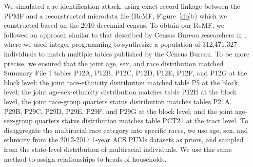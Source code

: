 \documentclass{article}
\begin{document}
We simulated a re-identification attack, using exact record linkage between the PPMF and a reconstructed microdata file (ReMF, Figure~\ref{db}b) which we constructed based on the 2010 decennial census. To obtain our ReMF, we followed an approach similar to that described by Census Bureau researchers in \cite{garfinkel2019understanding}, where we used integer programming to synthesize a population of 312,471,327 individuals to match multiple tables published by the Census Bureau. To be more precise, we ensured that the joint age, sex, and race distribution matched Summary File 1 tables P12A, P12B, P12C, P12D, P12E, P12F, and P12G at the block level; the joint race-ethnicity distribution matched table P5 at the block level; the joint age-sex-ethnicity distribution matches table P12H at the block level, the joint race-group quarters status distribution matches tables P21A, P29B, P29C, P29D, P29E, P29F, and P29G at the block level; and the joint age-sex-group quarters status distribution matches table PCT21 at the tract level. To disaggregate the multiracial race category into specific races, we use age, sex, and ethnicity from the 2012-2017 1-year ACS PUMs datasets as priors, and sampled from the state-level distribution of multiracial individuals. We use this same method to assign relationships to heads of households.
\end{document}
